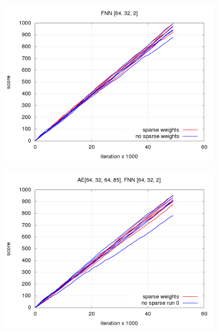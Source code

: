 \documentclass[10pt,a4paper]{article}
\begin{document}
\begin{figure}[!htb]
\centering
\begin{minipage}{.5\textwidth}
  \centering
  \includegraphics[scale=0.3]{../../results/rl_arcade/fnn_progress/testing_score.png}
  \label{img:FNN score}
\end{minipage}%
\begin{minipage}{.5\textwidth}
  \centering
  \includegraphics[scale=0.3]{../../results/rl_arcade/hnn_progress/testing_score.png}
  \label{img:AE+FNN score}
\end{minipage}
\end{figure}
\end{document}
